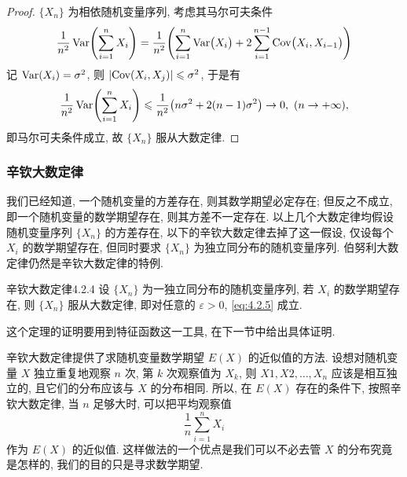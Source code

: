 \begin{proof}
    $ \{ X_n \} $ 为相依随机变量序列, 考虑其马尔可夫条件
    \begin{equation*}
        \frac{1}{n^2}\Var  \left( \sum_{i=1}^n X_i \right) = \frac{1}{n^2} \left( \sum_{i=1}^n\Var  \bigl( X_i \bigr) + 2 \sum_{i=1}^{n-1}\Cov  \bigl( X_i, X_{i-1} \bigr) \right)
    \end{equation*}
    记 $\operatorname{Var}  ( X_i ) = \sigma^2 $, 则 $ \lvert\Cov  ( X_i, X_j ) \rvert \leq \sigma^2 $, 于是有
    \begin{equation*}
        \frac{1}{n^2}\Var  \left( \sum_{i=1}^n X_i \right) \leq \frac{1}{n^2} \bigl( n \sigma^2 + 2 ( n - 1 ) \sigma^2 \bigr) \to 0, \ ( n \to +\infty ),
    \end{equation*}
    即马尔可夫条件成立, 故 $ \{ X_n \} $ 服从大数定律.
\end{proof}

\subsubsection{辛钦大数定律}

我们已经知道, 一个随机变量的方差存在, 则其数学期望必定存在; 但反之不成立, 即一个随机变量的数学期望存在, 则其方差不一定存在.
以上几个大数定律均假设随机变量序列 $ \{ X_n \} $ 的方差存在, 以下的辛钦大数定律去掉了这一假设, 仅设每个 $ X_i $ 的数学期望存在, 但同时要求 $ \{ X_n \} $ 为独立同分布的随机变量序列.
伯努利大数定律仍然是辛钦大数定律的特例.

\begin{theorem}{辛钦大数定律}{4.2.4}
    设 $ \{ X_n \} $ 为一独立同分布的随机变量序列, 若 $ X_i $ 的数学期望存在, 则 $ \{ X_n \} $ 服从大数定律, 即对任意的 $ \varepsilon > 0 $, \eqref{eq:4.2.5} 成立.
\end{theorem}

这个定理的证明要用到特征函数这一工具, 在下一节中给出具体证明.

辛钦大数定律提供了求随机变量数学期望 $ E ( X ) $ 的近似值的方法.
设想对随机变量 $ X $ 独立重复地观察 $ n $ 次, 第 $ k $ 次观察值为 $ X_k $, 则 $ X1,X2, \dotsc, X_n $ 应该是相互独立的, 且它们的分布应该与 $ X $ 的分布相同.
所以, 在 $ E (X) $ 存在的条件下, 按照辛钦大数定律, 当 $ n $ 足够大时, 可以把平均观察值
\begin{equation*}
    \frac{1}{n} \sum_{i=1}^n X_i
\end{equation*}
作为 $ E ( X ) $ 的近似值.
这样做法的一个优点是我们可以不必去管 $ X $ 的分布究竟是怎样的, 我们的目的只是寻求数学期望.

